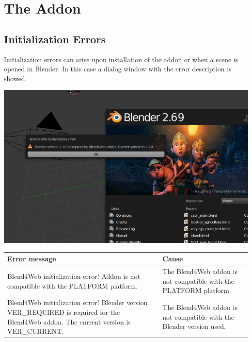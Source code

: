 \documentclass[a4paper,12pt,oneside]{sphinxmanual}
\begin{document}
\chapter{The Addon}
\label{addon:id1}\label{addon::doc}\label{addon:addon}

\section{Initialization Errors}
\label{addon:id2}\label{addon:index-0}\label{addon:initialization-errors}
Initialization errors can arise upon installation of the addon or when a scene is opened in Blender. In this case a dialog window with the error description is showed.

{\hfill\includegraphics[width=1.000\linewidth]{init_error_message.jpg}\hfill}

\begin{DUlineblock}{0em}
\item[] 
\end{DUlineblock}

\begin{tabulary}{\linewidth}{|L|L|}
\hline
\textsf{\relax 
Error message
} & \textsf{\relax 
Cause
}\\
\hline
Blend4Web initialization error!
Addon is not compatible with
the PLATFORM platform.
 & 
The Blend4Web addon is not compatible with the PLATFORM platform.
\\

Blend4Web initialization error!
Blender version VER\_REQUIRED is
required for the Blend4Web addon.
The current version is VER\_CURRENT.
 & 
The Blend4Web addon is not compatible with the Blender version used.
\\
\hline\end{tabulary}
\end{document}
